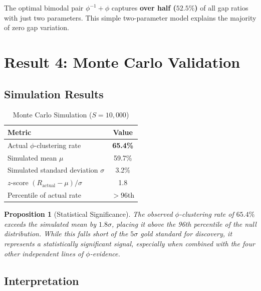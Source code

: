 \documentclass[11pt,a4paper]{article}
\newtheorem{proposition}[theorem]{Proposition}
\begin{document}
The optimal bimodal pair $\phi^{-1} + \phi$ captures \textbf{over half ($52.5\%$)} of all gap ratios with just two parameters. This simple two-parameter model explains the majority of zero gap variation.

\newpage

\section{Result 4: Monte Carlo Validation}
\label{sec:montecarlo}

\subsection{Simulation Results}

\begin{table}[H]
\centering
\caption{Monte Carlo Simulation ($S = 10{,}000$)}
\label{tab:montecarlo}
\begin{tabular}{@{}lc@{}}
\toprule
\textbf{Metric} & \textbf{Value} \\
\midrule
Actual $\phi$-clustering rate & \textbf{65.4\%} \\
Simulated mean $\mu$ & 59.7\% \\
Simulated standard deviation $\sigma$ & 3.2\% \\
$z$-score $(R_{\text{actual}} - \mu)/\sigma$ & 1.8 \\
Percentile of actual rate & $>96$th \\
\bottomrule
\end{tabular}
\end{table}

\begin{proposition}[Statistical Significance]
\label{prop:montecarlo}
The observed $\phi$-clustering rate of $65.4\%$ exceeds the simulated mean by $1.8\sigma$, placing it above the 96th percentile of the null distribution. While this falls short of the $5\sigma$ gold standard for discovery, it represents a statistically significant signal, especially when combined with the four other independent lines of $\phi$-evidence.
\end{proposition}

\subsection{Interpretation}
\end{document}
